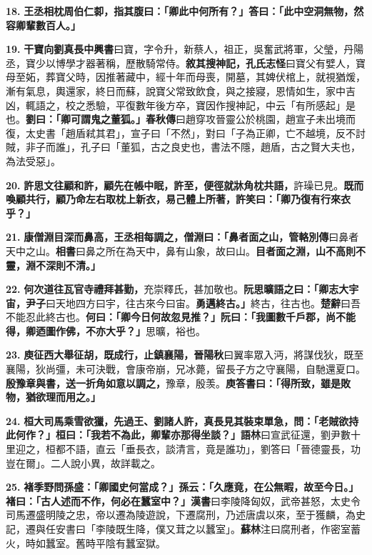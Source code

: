 \textbf{18.} \textbf{王丞相枕周伯仁厀，指其腹曰：「卿此中何所有？」答曰：「此中空洞無物，然容卿輩數百人。」}

\textbf{19.} \textbf{干寶向劉真長}{\footnotesize \textbf{中興書}曰寶，字令升，新蔡人，祖正，吳奮武將軍，父瑩，丹陽丞，寶少以博學才器著稱，歷散騎常侍。}\textbf{敘其搜神記，}{\footnotesize \textbf{孔氏志怪}曰寶父有嬖人，寶母至妬，葬寶父時，因推著藏中，經十年而母喪，開墓，其婢伏棺上，就視猶煖，漸有氣息，輿還家，終日而蘇，說寶父常致飲食，與之接寢，恩情如生，家中吉凶，輒語之，校之悉驗，平復數年後方卒，寶因作搜神記，中云「有所感起」是也。}\textbf{劉曰：「卿可謂鬼之董狐。」}{\footnotesize \textbf{春秋傳}曰趙穿攻晉靈公於桃園，趙宣子未出境而復，太史書「趙盾弒其君」，宣子曰「不然」，對曰「子為正卿，亡不越境，反不討賊，非子而誰」，孔子曰「董狐，古之良史也，書法不隱，趙盾，古之賢大夫也，為法受惡」。}

\textbf{20.} \textbf{許思文往顧和許，顧先在帳中眠，許至，便徑就牀角枕共語，}{\footnotesize 許璪已見。}\textbf{既而喚顧共行，顧乃命左右取枕上新衣，易己體上所著，許笑曰：「卿乃復有行來衣乎？」}

\textbf{21.} \textbf{康僧淵目深而鼻高，王丞相每調之，僧淵曰：「鼻者面之山，}{\footnotesize \textbf{管輅別傳}曰鼻者天中之山。\textbf{相書}曰鼻之所在為天中，鼻有山象，故曰山。}\textbf{目者面之淵，山不高則不靈，淵不深則不清。」}

\textbf{22.} \textbf{何次道往瓦官寺禮拜甚勤，}{\footnotesize 充崇釋氏，甚加敬也。}\textbf{阮思曠語之曰：「卿志大宇宙，}{\footnotesize \textbf{尹子}曰天地四方曰宇，往古來今曰宙。}\textbf{勇邁終古。」}{\footnotesize 終古，往古也。\textbf{楚辭}曰吾不能忍此終古也。}\textbf{何曰：「卿今日何故忽見推？」阮曰：「我圖數千戶郡，尚不能得，卿迺圖作佛，不亦大乎？」}{\footnotesize 思曠，裕也。}

\textbf{23.} \textbf{庾征西大舉征胡，既成行，止鎮襄陽，}{\footnotesize \textbf{晉陽秋}曰翼率眾入沔，將謀伐狄，既至襄陽，狄尚彊，未可決戰，會康帝崩，兄冰薨，留長子方之守襄陽，自馳還夏口。}\textbf{殷豫章與書，送一折角如意以調之，}{\footnotesize 豫章，殷羡。}\textbf{庾答書曰：「得所致，雖是敗物，猶欲理而用之。」}

\textbf{24.} \textbf{桓大司馬乘雪欲獵，先過王、劉諸人許，真長見其裝束單急，問：「老賊欲持此何作？」桓曰：「我若不為此，卿輩亦那得坐談？」}{\footnotesize \textbf{語林}曰宣武征還，劉尹數十里迎之，桓都不語，直云「垂長衣，談清言，竟是誰功」，劉答曰「晉德靈長，功豈在爾」。二人說小異，故詳載之。}

\textbf{25.} \textbf{褚季野問孫盛：「卿國史何當成？」孫云：「久應竟，在公無暇，故至今日。」褚曰：「古人述而不作，何必在蠶室中？」}{\footnotesize \textbf{漢書}曰李陵降匈奴，武帝甚怒，太史令司馬遷盛明陵之忠，帝以遷為陵遊說，下遷腐刑，乃述唐虞以來，至于獲麟，為史記，遷與任安書曰「李陵既生降，僕又茸之以蠶室」。\textbf{蘇林}注曰腐刑者，作密室蓄火，時如蠶室。舊時平陰有蠶室獄。}


